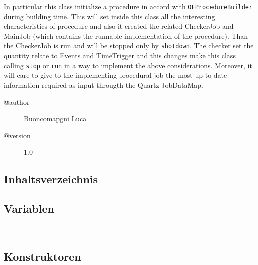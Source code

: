  In particular this class initialize a procedure in accord
 with \texttt{\hyperlink{ontologyFramework.OFProcedureManagment.OFProcedureBuilder-class}{OFProcedureBuilder}} during building time. This will
 set inside this class all the interesting characteristics of
 procedure and also it created the related CheckerJob and MainJob
 (which contains the runnable implementation of the procedure). Than 
 the CheckerJob is run and will be stopped only by \texttt{\hyperlink{ontologyFramework.OFProcedureManagment.Algorithm.shotdown()}{shotdown}}.
 The checker set the quantity relate to Events and TimeTrigger and this
 changes make this class calling \texttt{\hyperlink{ontologyFramework.OFProcedureManagment.Algorithm.stop()}{stop}} or \texttt{\hyperlink{ontologyFramework.OFProcedureManagment.Algorithm.run()}{run}} in a 
 way to implement the above considerations. Moreover, it will care
 to give to the implementing procedural job the most up to date
 information required as input througth the Quartz JobDataMap.
\begin{description}
\item[@author] 
Buoncomapgni Luca
\item[@version] 
1.0
\end{description}
\subsection{Inhaltsverzeichnis}
\subsection{Variablen}
\begin{description}
\item[{\label{ontologyFramework.OFProcedureManagment.Algorithm.chekerName}}]
~ 
\end{description}
\subsection{Konstruktoren}
\begin{description}
\item[{\label{ontologyFramework.OFProcedureManagment.Algorithm()}}]
~ 
\end{description}
